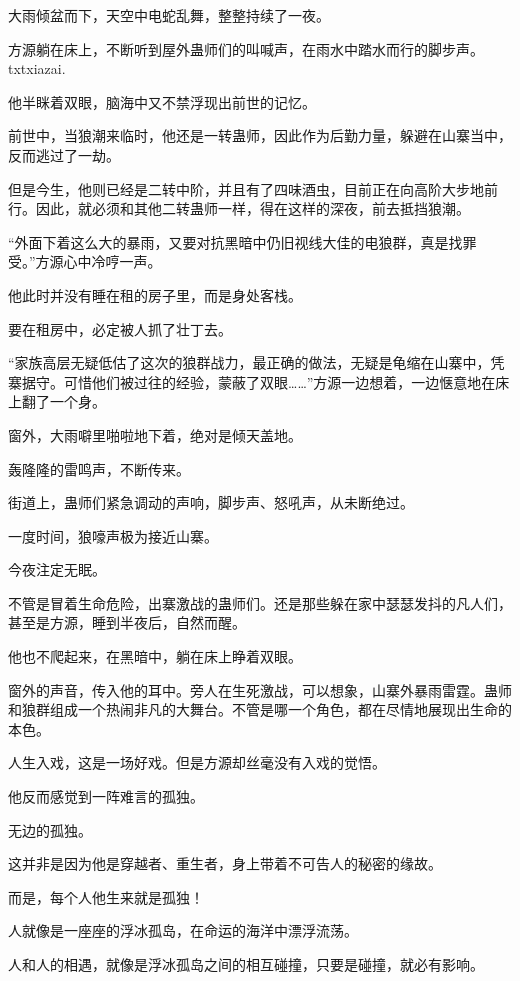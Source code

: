 
\begin{this_body}

大雨倾盆而下，天空中电蛇乱舞，整整持续了一夜。

方源躺在床上，不断听到屋外蛊师们的叫喊声，在雨水中踏水而行的脚步声。txtxiazai.

他半眯着双眼，脑海中又不禁浮现出前世的记忆。

前世中，当狼潮来临时，他还是一转蛊师，因此作为后勤力量，躲避在山寨当中，反而逃过了一劫。

但是今生，他则已经是二转中阶，并且有了四味酒虫，目前正在向高阶大步地前行。因此，就必须和其他二转蛊师一样，得在这样的深夜，前去抵挡狼潮。

“外面下着这么大的暴雨，又要对抗黑暗中仍旧视线大佳的电狼群，真是找罪受。”方源心中冷哼一声。

他此时并没有睡在租的房子里，而是身处客栈。

要在租房中，必定被人抓了壮丁去。

“家族高层无疑低估了这次的狼群战力，最正确的做法，无疑是龟缩在山寨中，凭寨据守。可惜他们被过往的经验，蒙蔽了双眼……”方源一边想着，一边惬意地在床上翻了一个身。

窗外，大雨噼里啪啦地下着，绝对是倾天盖地。

轰隆隆的雷鸣声，不断传来。

街道上，蛊师们紧急调动的声响，脚步声、怒吼声，从未断绝过。

一度时间，狼嚎声极为接近山寨。

今夜注定无眠。

不管是冒着生命危险，出寨激战的蛊师们。还是那些躲在家中瑟瑟发抖的凡人们，甚至是方源，睡到半夜后，自然而醒。

他也不爬起来，在黑暗中，躺在床上睁着双眼。

窗外的声音，传入他的耳中。旁人在生死激战，可以想象，山寨外暴雨雷霆。蛊师和狼群组成一个热闹非凡的大舞台。不管是哪一个角色，都在尽情地展现出生命的本色。

人生入戏，这是一场好戏。但是方源却丝毫没有入戏的觉悟。

他反而感觉到一阵难言的孤独。

无边的孤独。

这并非是因为他是穿越者、重生者，身上带着不可告人的秘密的缘故。

而是，每个人他生来就是孤独！

人就像是一座座的浮冰孤岛，在命运的海洋中漂浮流荡。

人和人的相遇，就像是浮冰孤岛之间的相互碰撞，只要是碰撞，就必有影响。


\end{this_body}
